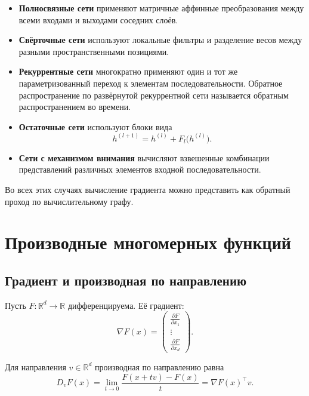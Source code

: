 \documentclass[12pt,a4paper]{article}
\theoremstyle{plain}
\theoremstyle{definition}
\theoremstyle{remark}
\newcommand{\R}{\mathbb{R}}
\begin{document}
\begin{itemize}
    \item \textbf{Полносвязные сети} применяют матричные аффинные
    преобразования между всеми входами и выходами соседних слоёв.

    \item \textbf{Свёрточные сети} используют локальные фильтры и
    разделение весов между разными пространственными позициями.

    \item \textbf{Рекуррентные сети} многократно применяют один и тот
    же параметризованный переход к элементам последовательности.
    Обратное распространение по развёрнутой рекуррентной сети
    называется обратным распространением во времени.

    \item \textbf{Остаточные сети} используют блоки вида
    \[
        h^{(l+1)}
        =
        h^{(l)}
        +
        F_l\bigl(h^{(l)}\bigr).
    \]

    \item \textbf{Сети с механизмом внимания} вычисляют
    взвешенные комбинации представлений различных элементов
    входной последовательности.
\end{itemize}

Во всех этих случаях вычисление градиента можно представить как
обратный проход по вычислительному графу.

\section{Производные многомерных функций}

\subsection{Градиент и производная по направлению}

Пусть $F\colon\R^d\to\R$ дифференцируема. Её градиент:
\[
    \nabla F(x)
    =
    \begin{pmatrix}
        \frac{\partial F}{\partial x_1}\\
        \vdots\\
        \frac{\partial F}{\partial x_d}
    \end{pmatrix}.
\]

Для направления $v\in\R^d$ производная по направлению равна
\[
    D_vF(x)
    =
    \lim_{t\to 0}
    \frac{F(x+tv)-F(x)}{t}
    =
    \nabla F(x)^\top v.
\]
\end{document}
